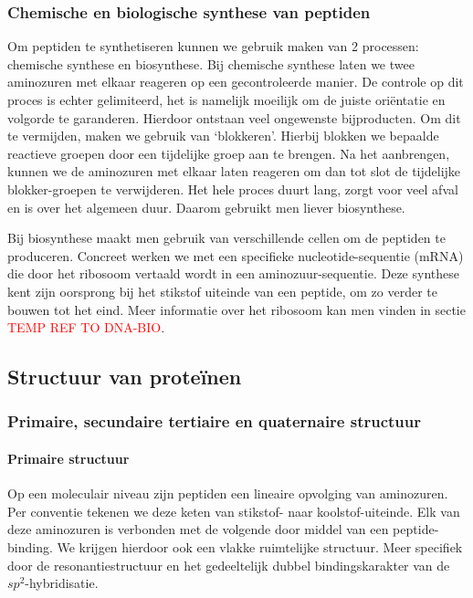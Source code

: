 \documentclass[a4paper,kul]{kulakarticle} %
\begin{document}
\subsubsection{Chemische en biologische synthese van peptiden}
Om peptiden te synthetiseren kunnen we gebruik maken van 2 processen: chemische synthese en biosynthese. Bij chemische synthese laten we twee aminozuren met elkaar reageren op een gecontroleerde manier. De controle op dit proces is echter gelimiteerd, het is namelijk moeilijk om de juiste oriëntatie en volgorde te garanderen. Hierdoor ontstaan veel ongewenste bijproducten. Om dit te vermijden, maken we gebruik van `blokkeren'. Hierbij blokken we bepaalde reactieve groepen door een tijdelijke groep aan te brengen. Na het aanbrengen, kunnen we de aminozuren met elkaar laten reageren om dan tot slot de tijdelijke blokker-groepen te verwijderen. Het hele proces duurt lang, zorgt voor veel afval en is over het algemeen duur. Daarom gebruikt men liever biosynthese.

Bij biosynthese maakt men gebruik van verschillende cellen om de peptiden te produceren. Concreet werken we met een specifieke nucleotide-sequentie (mRNA) die door het ribosoom vertaald wordt in een aminozuur-sequentie. Deze synthese kent zijn oorsprong bij het stikstof uiteinde van een peptide, om zo verder te bouwen tot het eind. Meer informatie over het ribosoom kan men vinden in sectie \textcolor{red}{TEMP REF TO DNA-BIO}.
\newpage
\subsection{Structuur van proteïnen}
\subsubsection{Primaire, secundaire tertiaire en quaternaire structuur}
\paragraph{Primaire structuur}
Op een moleculair niveau zijn peptiden een lineaire opvolging van aminozuren. Per conventie tekenen we deze keten van stikstof- naar koolstof-uiteinde. Elk van deze aminozuren is verbonden met de volgende door middel van een peptide-binding. We krijgen hierdoor ook een vlakke ruimtelijke structuur. Meer specifiek door de resonantiestructuur en het gedeeltelijk dubbel bindingskarakter van de $sp^2$-hybridisatie. 
\end{document}
